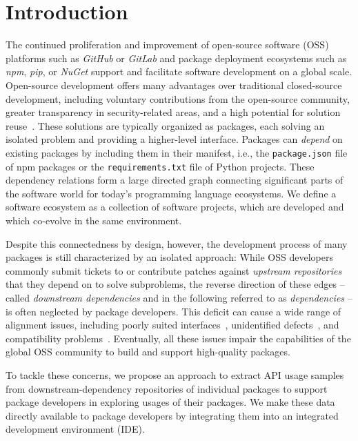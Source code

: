 \documentclass[a4paper,twoside]{article}
\begin{document}
\onecolumn \maketitle \normalsize \setcounter{footnote}{0} \vfill

\section{Introduction}
\label{sec:introduction}

The continued proliferation and improvement of open-source software (OSS) platforms such as \emph{GitHub} or \emph{GitLab} and package deployment ecosystems such as \emph{npm}, \emph{pip}, or \emph{NuGet} support and facilitate software development on a global scale.
Open-source development offers many advantages over traditional closed-source development, including voluntary contributions from the open-source community, greater transparency in security-related areas, and a high potential for solution reuse~\cite{saied2018-reusability}.
These solutions are typically organized as packages, each solving an isolated problem and providing a higher-level interface.
Packages can \emph{depend} on existing packages by including them in their manifest, i.e., the \texttt{package.json} file of npm packages or the \texttt{requirements.txt} file of Python projects.
These dependency relations form a large directed graph connecting significant parts of the software world for today's programming language ecosystems.
We define a software ecosystem as a collection of software projects, which are developed and which co-evolve in the same environment.

Despite this connectedness by design, however, the development process of many packages is still characterized by an isolated approach:
While OSS developers commonly submit tickets to or contribute patches against \emph{upstream repositories} that they depend on to solve subproblems, the reverse direction of these edges -- called \emph{downstream dependencies} and in the following referred to as \emph{dependencies} -- is often neglected by package developers.
This deficit can cause a wide range of alignment issues, including poorly suited interfaces~\cite{piccioni2013empirical}, unidentified defects~\cite{wong2017more}, and compatibility problems~\cite{bogart2015breaks}.
Eventually, all these issues impair the capabilities of the global OSS community to build and support high-quality packages.

To tackle these concerns, we propose an approach to extract API usage samples from downstream-dependency repositories of individual packages to support package developers in exploring usages of their packages.
We make these data directly available to package developers by integrating them into an integrated development environment (IDE).
\end{document}
